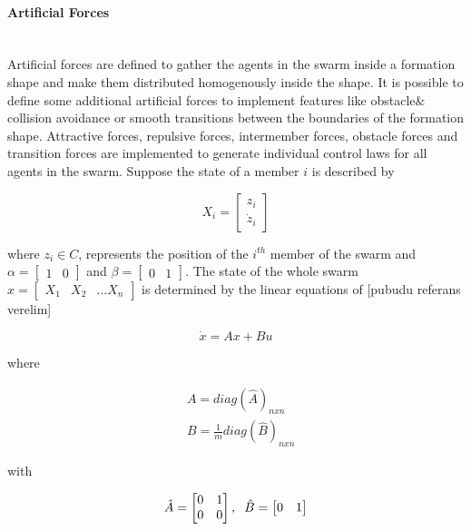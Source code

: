 \paragraph{Artificial Forces}\hspace{0pt} \\
Artificial forces are defined to gather the agents in the swarm inside a formation shape and make them distributed homogenously inside the shape. It is possible to define some additional artificial forces to implement features like obstacle$\&$collision avoidance or smooth transitions between the boundaries of the formation shape. Attractive forces, repulsive forces, intermember forces, obstacle forces and transition forces are implemented to generate individual control laws for all agents in the swarm. Suppose the state of a member $i$ is described by

\begin{equation}
X_i = \begin{bmatrix}
z_i\\ \dot{z}_i
\end{bmatrix}
\end{equation}

where  $z_i \in C$, represents the position of the $i^{th}$ member of the swarm and $\alpha = \begin{bmatrix}
1 & 0
\end{bmatrix}$ and $\beta = \begin{bmatrix}
0 & 1
\end{bmatrix}$. The state of the whole swarm $x= \begin{bmatrix}
X_1 & X_2 & ... X_n
\end{bmatrix}$ is determined by the linear equations of [pubudu referans verelim]

\begin{equation}
\dot{x} = Ax + Bu
\end{equation}

where

\begin{align*}
&A = diag\left(\hat{A}\right)_{nxn}\\
&B = \frac{1}{m} diag\left(\hat{B}\right)_{nxn}
\end{align*}
			
with

\begin{equation}
\hat{A} = \begin{bmatrix}
0&1\\0&0
\end{bmatrix} , \hspace{0.2cm} \hat{B} = \begin{bmatrix}
0&1
\end{bmatrix}
\end{equation}
			
